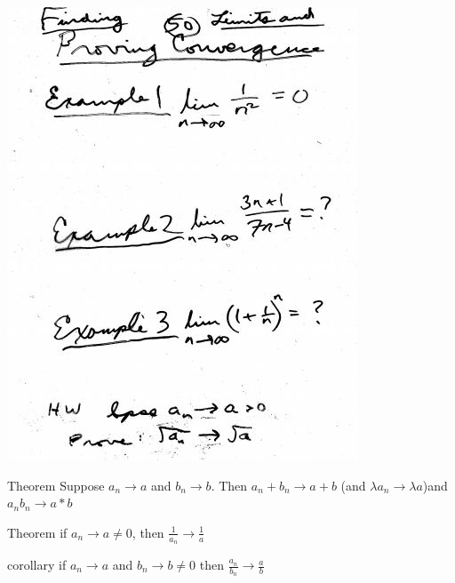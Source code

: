 \documentclass[10pt,a4paper]{article}
\begin{document}
{{\includegraphics[scale=.7]{Pages/S&L_page50}

\newpage











{Theorem Suppose $a_n \rightarrow a$ and $b_n \rightarrow b$. Then $a_n + b_n \rightarrow a + b$ (and $ \lambda a_n \rightarrow	\lambda a$)and $a_n b_n \rightarrow a * b$}\newline

{Theorem if $a_n \rightarrow a \neq 0$, then $\frac{1}{a_n} \rightarrow \frac{1}{a}$}\newline

{corollary if $a_n \rightarrow a$ and $b_n \rightarrow b \neq 0$ then $\frac{a_n}{b_n} \rightarrow \frac{a}{b}$} \newline

}}
\end{document}
